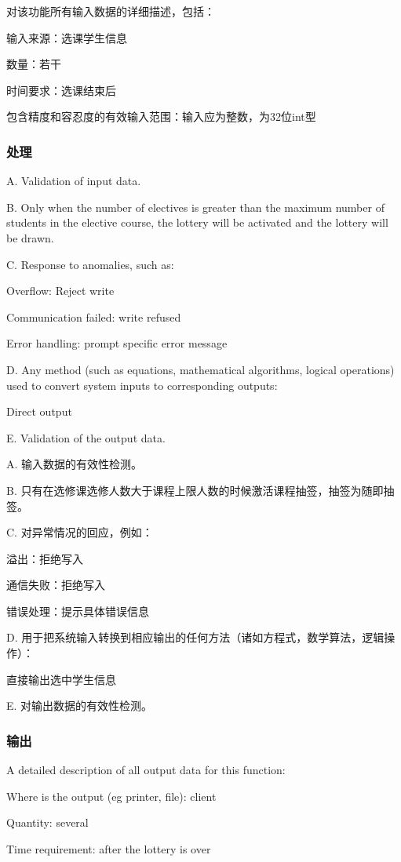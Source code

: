 对该功能所有输入数据的详细描述，包括：

	输入来源：选课学生信息

	数量：若干

	时间要求：选课结束后

	包含精度和容忍度的有效输入范围：输入应为整数，为32位int型
		
\subsubsection{处理}

A. Validation of input data.

B. Only when the number of electives is greater than the maximum number of students in the elective course, the lottery will be activated and the lottery will be drawn.

C. Response to anomalies, such as:

Overflow: Reject write

Communication failed: write refused

Error handling: prompt specific error message

D. Any method (such as equations, mathematical algorithms, logical operations) used to convert system inputs to corresponding outputs:

Direct output

E. Validation of the output data.

A. 输入数据的有效性检测。

B. 只有在选修课选修人数大于课程上限人数的时候激活课程抽签，抽签为随即抽签。

C. 对异常情况的回应，例如：

	溢出：拒绝写入

	通信失败：拒绝写入

	错误处理：提示具体错误信息

D. 用于把系统输入转换到相应输出的任何方法（诸如方程式，数学算法，逻辑操作）：

	直接输出选中学生信息

E.	对输出数据的有效性检测。
\subsubsection{输出}
A detailed description of all output data for this function:

Where is the output (eg printer, file): client

Quantity: several

Time requirement: after the lottery is over

